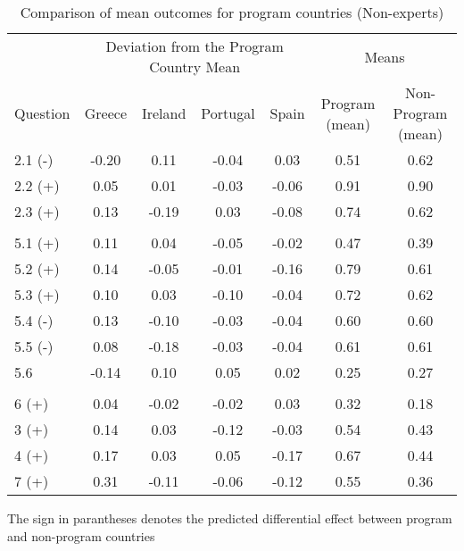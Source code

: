 
\begin{table}[htbp]\centering
\def\sym#1{\ifmmode^{#1}\else\(^{#1}\)\fi}
\caption{Comparison of mean outcomes for program countries (Non-experts)}
\begin{tabular}{l*{6}{c}}
\hline\hline
&\multicolumn{4}{c}{Deviation from the Program Country Mean} &\multicolumn{2}{c}{Means} \\
           Question &\multicolumn{1}{c}{Greece}&\multicolumn{1}{c}{Ireland}&\multicolumn{1}{c}{Portugal}&\multicolumn{1}{c}{Spain}&\multicolumn{1}{c}{Program (mean)}&\multicolumn{1}{c}{Non-Program (mean) }\\
  
\hline
2.1 (-)       &       -0.20&        0.11&       -0.04&        0.03&        0.51&        0.62\\
2.2 (+)        &        0.05&        0.01&       -0.03&       -0.06&        0.91&        0.90\\
2.3 (+)       &        0.13&       -0.19&        0.03&       -0.08&        0.74&        0.62\\
\hline
&&&&&& \\
5.1 (+)        &        0.11&        0.04&       -0.05&       -0.02&        0.47&        0.39\\
5.2 (+)        &        0.14&       -0.05&       -0.01&       -0.16&        0.79&        0.61\\
5.3 (+)        &        0.10&        0.03&       -0.10&       -0.04&        0.72&        0.62\\
5.4 (-)        &        0.13&       -0.10&       -0.03&       -0.04&        0.60&        0.60\\
5.5 (-)        &        0.08&       -0.18&       -0.03&       -0.04&        0.61&        0.61\\
5.6         &       -0.14&        0.10&        0.05&        0.02&        0.25&        0.27\\
\hline
&&&&&& \\
6  (+)         &        0.04&       -0.02&       -0.02&        0.03&        0.32&        0.18\\
3  (+)          &        0.14&        0.03&       -0.12&       -0.03&        0.54&        0.43\\
4  (+)          &        0.17&        0.03&        0.05&       -0.17&        0.67&        0.44\\
7  (+)          &        0.31&       -0.11&       -0.06&       -0.12&        0.55&        0.36\\
\hline\hline
\end{tabular}
\begin{tablenotes}
\item The sign in parantheses denotes the predicted differential effect between program and non-program countries 
\end{tablenotes}
\end{table}


